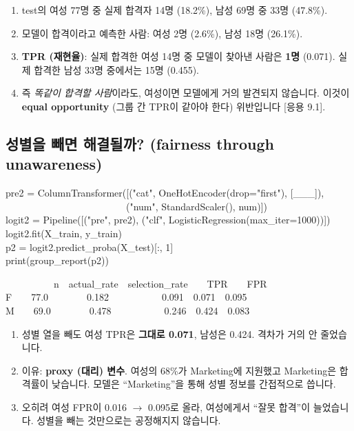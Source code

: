\documentclass[11pt,a4paper]{article}
\newcommand{\term}[1]{\textbf{#1}}
\begin{document}
\begin{howbox}
\begin{enumerate}
\item test의 여성 77명 중 실제 합격자 14명 (18.2\%), 남성 69명 중 33명 (47.8\%).
\item 모델이 합격이라고 예측한 사람: 여성 2명 (2.6\%), 남성 18명 (26.1\%).
\item \textbf{TPR (재현율)}: 실제 합격한 여성 14명 중 모델이 찾아낸 사람은 \textbf{1명} (0.071). 실제 합격한 남성 33명 중에서는 15명 (0.455).
\item 즉 \emph{똑같이 합격할 사람}이라도, 여성이면 모델에게 거의 발견되지 않습니다. 이것이 \term{equal opportunity} (그룹 간 TPR이 같아야 한다) 위반입니다 [응용 9.1].
\end{enumerate}
\end{howbox}

\subsection{성별을 빼면 해결될까? (fairness through unawareness)}
\begin{codebox}
pre2 = ColumnTransformer([("cat", OneHotEncoder(drop="first"), [\_\_\_]),\\
\ \ \ \ \ \ \ \ \ \ \ \ \ \ \ \ \ \ \ \ \ \ \ \ \ ("num", StandardScaler(), num)])\\
logit2 = Pipeline([("pre", pre2), ("clf", LogisticRegression(max\_iter=1000))])\\
logit2.fit(X\_train, y\_train)\\
p2 = logit2.predict\_proba(X\_test)[:, 1]\\
print(group\_report(p2))
\end{codebox}
\begin{outbox}
\ \ \ \ \ \ \ \ \ \ n\ \ actual\_rate\ \ selection\_rate\ \ \ \ TPR\ \ \ \ FPR\\
F\ \ \ \ 77.0\ \ \ \ \ \ \ \ 0.182\ \ \ \ \ \ \ \ \ \ \ 0.091\ \ 0.071\ \ 0.095\\
M\ \ \ \ 69.0\ \ \ \ \ \ \ \ 0.478\ \ \ \ \ \ \ \ \ \ \ 0.246\ \ 0.424\ \ 0.083
\end{outbox}
\begin{howbox}
\begin{enumerate}
\item 성별 열을 빼도 여성 TPR은 \textbf{그대로 0.071}, 남성은 0.424. 격차가 거의 안 줄었습니다.
\item 이유: \textbf{proxy (대리) 변수}. 여성의 68\%가 Marketing에 지원했고 Marketing은 합격률이 낮습니다. 모델은 ``Marketing''을 통해 성별 정보를 간접적으로 씁니다.
\item 오히려 여성 FPR이 0.016 $\to$ 0.095로 올라, 여성에게서 ``잘못 합격''이 늘었습니다. 성별을 빼는 것만으로는 공정해지지 않습니다.
\end{enumerate}
\end{howbox}
\end{document}
